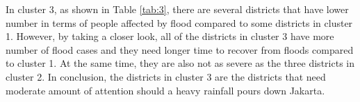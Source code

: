 \noindent
In cluster 3, as shown in Table \ref{tab:3}, there are several districts that have lower number in terms of people affected by flood compared to some districts in cluster 1. However, by taking a closer look, all of the districts in cluster 3 have more number of flood cases and they need longer time to recover from floods compared to cluster 1. At the same time, they are also not as severe as the three districts in cluster 2. In conclusion, the districts in cluster 3 are the districts that need moderate amount of attention should a heavy rainfall pours down Jakarta.\\


